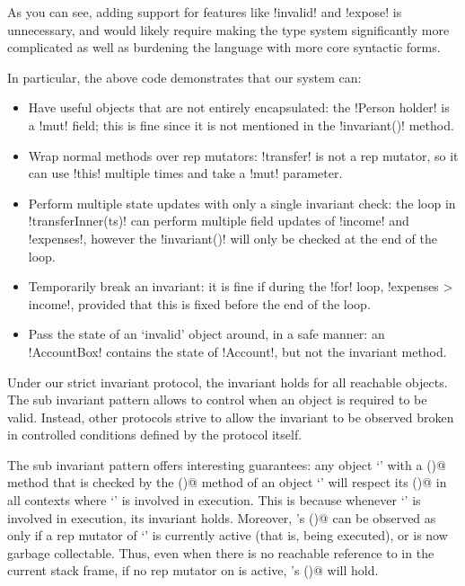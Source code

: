 As you can see, adding support for features like \Q!invalid! and \Q!expose! is unnecessary, and would likely require making the type system significantly more complicated as well as burdening the language with more core syntactic forms.

In particular, the above code demonstrates that our system can:
\begin{itemize}
\item Have useful objects that are not entirely encapsulated: the \Q!Person holder! is a \Q!mut! field; this is fine since it is not mentioned in the \Q!invariant()! method.
\item Wrap normal methods over rep mutators: \Q!transfer! is not a rep mutator, so it can use \Q!this! multiple times and take a \Q!mut! parameter.
\item Perform multiple state updates with only a single invariant check: the loop in \Q!transferInner(ts)! can perform multiple field updates of \Q!income! and \Q!expenses!, however the \Q!invariant()! will only be checked at the end of the loop.
\item Temporarily break an invariant: it is fine if during the \Q!for! loop, \Q!expenses > income!, provided that this is fixed before the end of the loop.
\item Pass the state of an `invalid' object around, in a safe manner: an \Q!AccountBox! contains the state of \Q!Account!, but not the invariant method.
\end{itemize}

Under our strict invariant protocol, the invariant holds for all reachable objects.
The sub invariant pattern allows to control when an object is required to be valid.
Instead, other protocols strive to allow the invariant to be observed broken in controlled conditions defined by the protocol itself.

The sub invariant pattern offers interesting guarantees:
any object `\Q@a@' with a \Q@subInvariant()@ method that is checked by the \Q@invariant()@ method of an object `\Q@b@'
will respect its \Q@subInvariant()@ in all contexts where `\Q@b@' is involved in execution.
This is because whenever `\Q@b@' is involved in execution, its invariant holds.
Moreover, \Q@a@'s \Q@subInvariant()@ can be observed as \Q@false@ only if a rep mutator of `\Q@b@' is currently active (that is, being executed),
or \Q@b@ is now garbage collectable.
Thus, even when there is no reachable reference to \Q@b@ in the current stack frame,
if no rep mutator on \Q@b@ is active, \Q@a@'s \Q@subInvariant()@ will hold.

